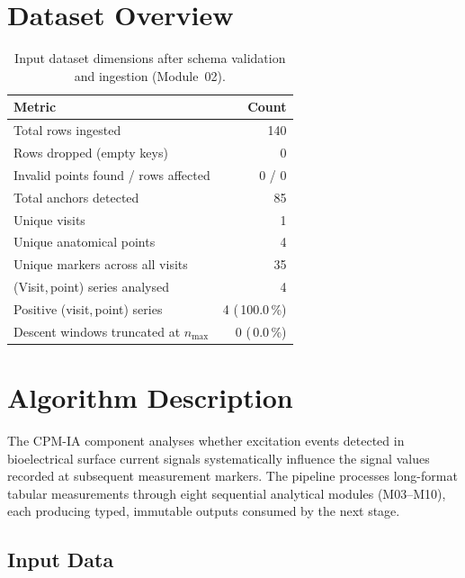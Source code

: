 \documentclass[a4paper,11pt]{article}
\begin{document}
\section{Dataset Overview}

\begin{table}[h!]
\centering
\small
\caption{Input dataset dimensions after schema validation and ingestion (Module~02).}
\begin{tabular}{lr}
\toprule
\textbf{Metric} & \textbf{Count} \\
\midrule
Total rows ingested                        & 140 \\
Rows dropped (empty keys)                  & 0 \\
Invalid points found / rows affected       & 0 / 0 \\
Total anchors detected                     & 85 \\
Unique visits                          & 1 \\
Unique anatomical points               & 4 \\
Unique markers across all visits       & 35 \\
(Visit,\,point) series analysed        & 4 \\
Positive (visit,\,point) series        & 4 (\,100.0\,\%) \\
Descent windows truncated at $n_{\max}$ & 0 (\,0.0\,\%) \\
\bottomrule
\end{tabular}
\end{table}

\section{Algorithm Description}

The CPM-IA component analyses whether excitation events detected in bioelectrical surface
current signals systematically influence the signal values recorded at subsequent measurement
markers. The pipeline processes long-format tabular measurements through eight sequential
analytical modules (M03--M10), each producing typed, immutable outputs consumed by the next
stage.

\subsection{Input Data}
\end{document}
